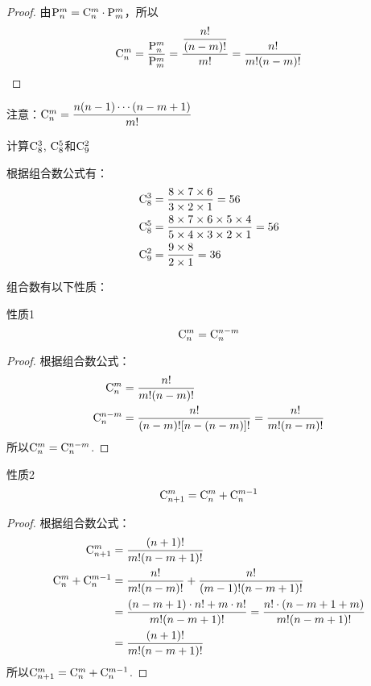 \begin{proof}
    由${\rm P}^{m}_{n}={\rm C}^{m}_{n}\cdot {\rm P}^{m}_{m}$，所以
\[{\rm C}^{m}_{n}=\dfrac{{\rm P}^{m}_{n}}{{\rm P}^{m}_{m}}=\dfrac{\dfrac{n!}{(n-m)!}}{m!}=\dfrac{n!}{m!(n-m)!}\]
\end{proof}
注意：${\rm C}^{m}_{n}=\dfrac{n(n-1)\cdots(n-m+1)}{m!}$

\begin{example}
计算${\rm C}^{3}_{8}$, ${\rm C}^{5}_{8}$和${\rm C}^{2}_{9}$
\end{example}

\begin{solution}
    根据组合数公式有：
\[\begin{split}
    {\rm C}^{3}_{8}&=\dfrac{8\times 7\times 6}{3\times 2\times 1}=56\\
    {\rm C}^{5}_{8}&=\dfrac{8\times 7\times 6\times 5\times 4}{5\times 4\times 3\times 2\times 1}=56\\
    {\rm C}^{2}_{9}&=\dfrac{9\times 8}{2\times 1}=36
\end{split}\]
\end{solution}

组合数有以下性质：
\begin{blk}
{性质1}$${\rm C}^{m}_{n}={\rm C}^{n-m}_{n}$$
\end{blk}

\begin{proof}
根据组合数公式：
\[\begin{split}
    {\rm C}^{m}_{n}&=\dfrac{n!}{m!(n-m)!}\\
    {\rm C}^{n-m}_{n}&=\dfrac{n!}{(n-m)![n-(n-m)]!}=\dfrac{n!}{m!(n-m)!}
\end{split}\]
所以${\rm C}^{m}_{n}={\rm C}^{n-m}_{n}$.
\end{proof}

\begin{blk}{性质2}
\[{\rm C}^{m}_{n+1}={\rm C}^{m}_{n}+{\rm C}^{m-1}_{n}\]
\end{blk}

\begin{proof}
根据组合数公式：
\[\begin{split}
    {\rm C}^{m}_{n+1}&=\dfrac{(n+1)!}{m!(n-m+1)!}\\
    {\rm C}^{m}_{n}+{\rm C}^{m-1}_{n}&=\dfrac{n!}{m!(n-m)!}+\dfrac{n!}{(m-1)!(n-m+1)!}\\
    &=\dfrac{(n-m+1)\cdot n! +m\cdot n!}{m!(n-m+1)!}=\dfrac{n!\cdot (n-m+1+m)}{m!(n-m+1)!}\\
    &=\dfrac{(n+1)!}{m!(n-m+1)!}\\
\end{split}\]
所以${\rm C}^{m}_{n+1}={\rm C}^{m}_{n}+{\rm C}^{m-1}_{n}$.
\end{proof}

